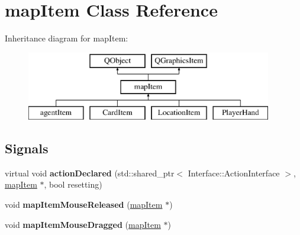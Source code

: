 \hypertarget{classmap_item}{\section{map\-Item Class Reference}
\label{classmap_item}
}
Inheritance diagram for map\-Item\-:\begin{figure}[H]
\begin{center}
\leavevmode
\includegraphics[height=3.000000cm]{classmap_item}
\end{center}
\end{figure}
\subsection*{Signals}
\begin{DoxyCompactItemize}
\item 
\hypertarget{classmap_item_acc8a3aafaf30f2647488c1d74b20580e}{virtual void {\bfseries action\-Declared} (std\-::shared\-\_\-ptr$<$ Interface\-::\-Action\-Interface $>$, \hyperlink{classmap_item}{map\-Item} $\ast$, bool resetting)}\label{classmap_item_acc8a3aafaf30f2647488c1d74b20580e}

\item 
\hypertarget{classmap_item_abb04390cb6e6bee21b34a89006ceefd2}{void {\bfseries map\-Item\-Mouse\-Released} (\hyperlink{classmap_item}{map\-Item} $\ast$)}\label{classmap_item_abb04390cb6e6bee21b34a89006ceefd2}

\item 
\hypertarget{classmap_item_a5533463a4d8c8fce25e87e510d213c7d}{void {\bfseries map\-Item\-Mouse\-Dragged} (\hyperlink{classmap_item}{map\-Item} $\ast$)}\label{classmap_item_a5533463a4d8c8fce25e87e510d213c7d}

\end{DoxyCompactItemize}
